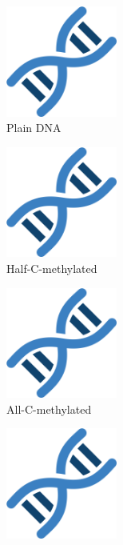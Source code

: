 \documentclass[parskip=full, numbers=noenddot]{scrreprt}
\begin{document}
\begin{figure}[htpb]
  \centering
  \begin{subfigure}[htpb]{0.4\textwidth}
    \centering
    \includegraphics[width=0.4\textwidth]{test}
    \caption{Plain DNA}
    \label{fig:freqplots_e8}
  \end{subfigure}
  \begin{subfigure}[htpb]{0.4\textwidth}
    \centering
    \includegraphics[width=0.4\textwidth]{test}
    \caption{Half-C-methylated}
    \label{fig:freqplots_f8}
  \end{subfigure}
  \begin{subfigure}[htpb]{0.4\textwidth}
    \centering
    \includegraphics[width=0.4\textwidth]{test}
    \caption{All-C-methylated}
    \label{fig:freqplots_g8}
  \end{subfigure}
  \begin{subfigure}[htpb]{0.4\textwidth}
    \centering
    \includegraphics[width=0.4\textwidth]{test}

\end{subfigure}
\end{figure}
\end{document}
